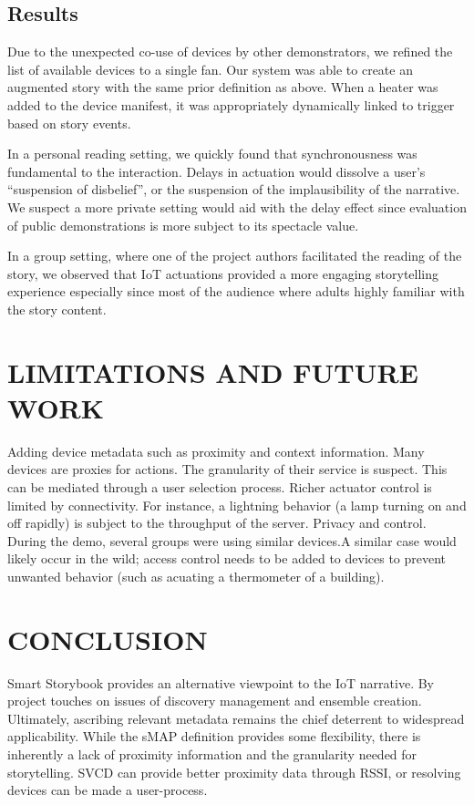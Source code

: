 \documentclass{sigchi}
\begin{document}
\subsection{Results}
Due to the unexpected co-use of devices by other demonstrators, we refined the list of available devices to a single fan. Our system was able to create an augmented story with the same prior definition as above. When a heater was added to the device manifest, it was appropriately dynamically linked to trigger based on story events. 

In a personal reading setting, we quickly found that synchronousness was fundamental to the interaction. Delays in actuation would dissolve a user's ``suspension of disbelief'', or the suspension of the implausibility of the narrative. We suspect a more private setting would aid with the delay effect since evaluation of public demonstrations is more subject to its spectacle value. 

In a group setting, where one of the project authors facilitated the reading of the story, we observed that IoT actuations provided a more engaging storytelling experience especially since most of the audience where adults highly familiar with the story content. 




\section{LIMITATIONS AND FUTURE WORK}
Adding device metadata such as proximity and context information. Many devices are proxies for actions. The granularity of their service is suspect. This can be mediated through a user selection process. 
Richer actuator control is limited by connectivity. For instance, a lightning behavior (a lamp turning on and off rapidly) is subject to the throughput of the server.
Privacy and control. During the demo, several groups were using similar devices.A similar case would likely occur in the wild; access control needs to be added to devices to prevent unwanted behavior (such as acuating a thermometer of a building). 

\section{CONCLUSION}
Smart Storybook provides an alternative viewpoint to the IoT narrative. By project touches on issues of discovery management and ensemble creation. Ultimately, ascribing relevant metadata remains the chief deterrent to widespread applicability. While the sMAP definition provides some flexibility,  there is inherently a lack of proximity information and the granularity needed for storytelling. SVCD can provide better proximity data through RSSI, or resolving devices can be made a user-process.
\end{document}
